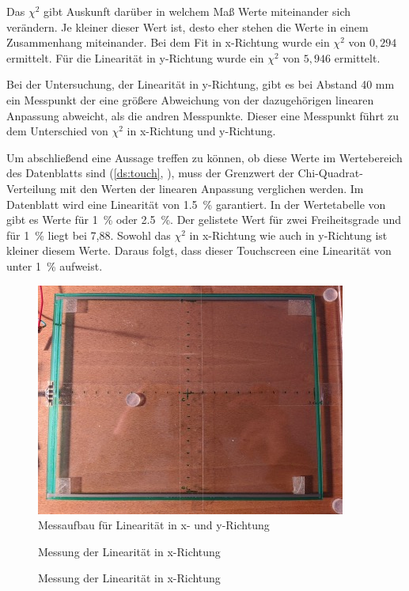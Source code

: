 Das \(\chi^2\) gibt Auskunft darüber in welchem Maß Werte miteinander sich verändern.
Je kleiner dieser Wert ist, desto eher stehen die Werte in einem Zusammenhang miteinander.
Bei dem Fit in x-Richtung wurde ein \(\chi^2\) von \(0,294\) ermittelt.
Für die Linearität in y-Richtung wurde ein \(\chi^2\) von \(5,946\) ermittelt.

Bei der Untersuchung, der Linearität in y-Richtung, gibt es bei Abstand 40 mm ein Messpunkt der eine größere Abweichung von der dazugehörigen linearen Anpassung abweicht, als die andren Messpunkte.
Dieser eine Messpunkt führt zu dem Unterschied von \(\chi^2\) in x-Richtung und y-Richtung.

Um abschließend eine Aussage treffen zu können, ob diese Werte im Wertebereich des Datenblatts sind (\cref{ds:touch}, ), muss der Grenzwert der Chi-Quadrat-Verteilung mit den Werten der linearen Anpassung verglichen werden.
Im Datenblatt wird eine Linearität von \SI{1,5}{\%} garantiert.
In der Wertetabelle von \cite{papula} gibt es Werte für \SI{1}{\%} oder \SI{2,5}{\%}.
Der gelistete Wert für zwei Freiheitsgrade und für \SI{1}{\%} liegt bei 7,88.
Sowohl das \(\chi^2\) in x-Richtung wie auch in y-Richtung ist kleiner diesem Werte.
Daraus folgt, dass dieser Touchscreen eine Linearität von unter \SI{1}{\%} aufweist.
\begin{figure}[ht!]
    \centering
    \includegraphics[width=0.6\linewidth]{fig/raster/messlinear.jpg}
    \caption{Messaufbau für Linearität in x- und y-Richtung}
    \label{fig:messlinear}
\end{figure}

\begin{figure}[ht!]
    \centering
    
    \caption{Messung der Linearität in x-Richtung}
    \label{fig:xlinear}
    
    \caption{Messung der Linearität in x-Richtung}
    \label{fig:ylinear}
\end{figure}
